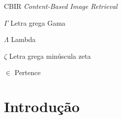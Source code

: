 \documentclass[
	12pt,				%
	openright,			%
	twoside,			%
	a4paper,			%
	english,			%
  	brazil				%
	]{abntex2}
\begin{document}

\listoffigures*
\cleardoublepage

\listoftables*
\cleardoublepage

\begin{siglas}
  \item[CBIR] \textit{Content-Based Image Retrieval}
\end{siglas}

\begin{simbolos}
  \item[$ \Gamma $] Letra grega Gama
  \item[$ \Lambda $] Lambda
  \item[$ \zeta $] Letra grega minúscula zeta
  \item[$ \in $] Pertence
\end{simbolos}

\tableofcontents*
\cleardoublepage


\textual

\chapter*[Introdução]{Introdução}


%



%

\end{document}
